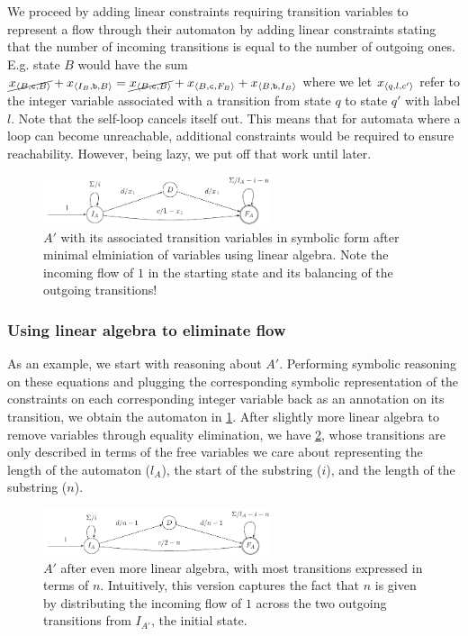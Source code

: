 We proceed by adding linear constraints requiring transition variables to
represent a flow through their automaton by adding linear constraints stating
that the number of incoming transitions is equal to the number of outgoing ones.
E.g. state $B$ would have the sum $\cancel{x_{\left\langle B, \texttt{c}, B\right\rangle}} +
x_{\left\langle I_B, \texttt{b}, B\right\rangle} = \cancel{x_{\left\langle B, \texttt{c}, B\right\rangle}}  +
x_{\left\langle B, \texttt{c}, F_B\right\rangle} + x_{\left\langle B, \texttt{b}, I_B\right\rangle}$ where we let
$x_{\left\langle q, l, c'\right\rangle}$ refer to the integer variable associated with a
transition from state $q$ to state $q'$ with label $l$. Note that the self-loop
cancels itself out. This means that for automata where a loop can become
unreachable, additional constraints would be required to ensure reachability.
However, being lazy, we put off that work until later.

\begin{figure}[h]
  \centering 
  \includegraphics[width=0.6\textwidth]{a_1}
  \caption{ $A'$ with its associated transition variables in symbolic form after
  minimal elminiation of variables using linear algebra. Note the incoming flow
  of $1$ in the starting state and its balancing of the outgoing transitions!
  }\label{fig:a_1}
\end{figure}

\subsubsection{Using linear algebra to eliminate flow}
As an example, we start with reasoning about $A'$. Performing symbolic reasoning
on these equations and plugging the corresponding symbolic representation of the
constraints on each corresponding integer variable back as an annotation on its
transition, we obtain the automaton in \cref{fig:a_1}. After slightly more
linear algebra to remove variables through equality elimination, we have
\cref{fig:a_2}, whose transitions are only described in terms of the free
variables we care about representing the length of the automaton ($l_A$), the
start of the substring ($i$), and the length of the substring ($n$).

\begin{figure}[h]
  \centering 
  \includegraphics[width=0.6\textwidth]{a_2}
  \caption{ $A'$ after even more linear algebra, with most transitions expressed
  in terms of $n$. Intuitively, this version captures the fact that $n$ is given
  by distributing the incoming flow of $1$ across the two outgoing transitions
  from $I_{A'}$, the initial state.}
  \label{fig:a_2}
\end{figure}

